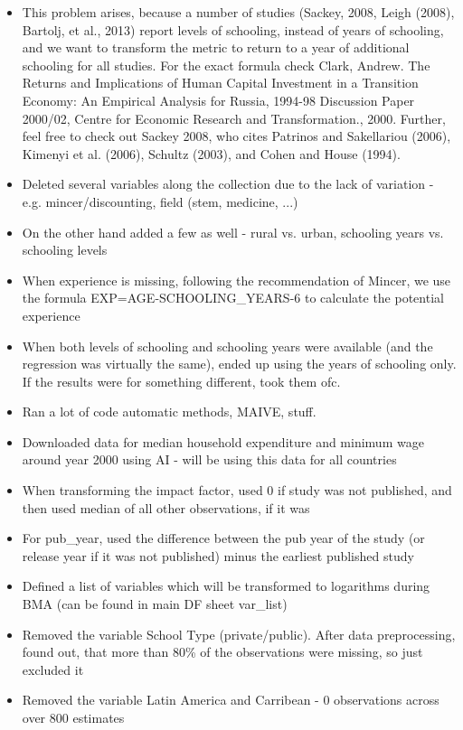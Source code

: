 \begin{itemize}
    \item This problem arises, because a number of studies (Sackey, 2008, Leigh (2008), Bartolj, et al., 2013) report levels of schooling, instead of years of schooling, and we want to transform the metric to return to a year of additional schooling for all studies.
        For the exact formula check Clark, Andrew. The Returns and
Implications of Human Capital
Investment in a Transition Economy:
An Empirical Analysis for Russia,
1994-98 Discussion Paper
2000/02, Centre for Economic
Research and Transformation.,
2000.
        Further, feel free to check out Sackey 2008, who cites Patrinos
    and Sakellariou (2006), Kimenyi et al. (2006), Schultz (2003), and Cohen and House (1994).
    \item Deleted several variables along the collection due to the lack of variation - e.g. mincer/discounting, field (stem, medicine, ...)
    \item On the other hand added a few as well - rural vs. urban, schooling years vs. schooling levels
    \item When experience is missing, following the recommendation of Mincer, we use the formula EXP=AGE-SCHOOLING\_YEARS-6 to calculate the potential experience
    \item When both levels of schooling and schooling years were available (and the regression was virtually the same), ended up using the years of schooling only. If the results were for something different, took them ofc.
    \item Ran a lot of code automatic methods, MAIVE, stuff.
    \item Downloaded data for median household expenditure and minimum wage around year 2000 using AI - will be using this data for all countries
    \item When transforming the impact factor, used 0 if study was not published, and then used median of all other observations, if it was
    \item For pub\_year, used the difference between the pub year of the study (or release year if it was not published) minus the earliest published study
    \item Defined a list of variables which will be transformed to logarithms during BMA (can be found in main DF sheet var\_list)
    \item Removed the variable School Type (private/public). After data preprocessing, found out, that more than 80\% of the observations were missing, so just excluded it 
    \item Removed the variable Latin America and Carribean - 0 observations across over 800 estimates

\end{itemize}
